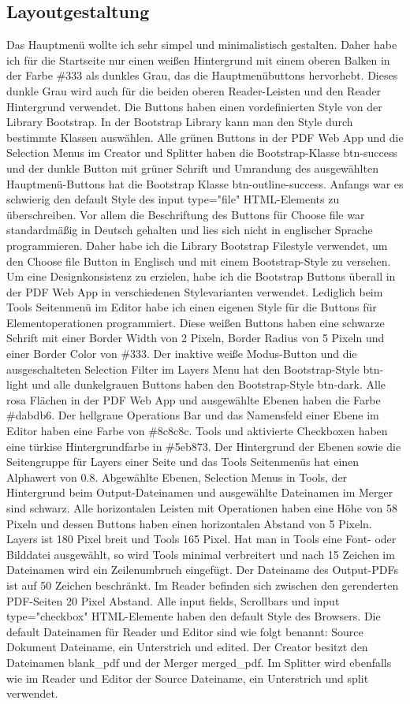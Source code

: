 \subsection{Layoutgestaltung}
Das Hauptmenü wollte ich sehr simpel und minimalistisch gestalten. Daher habe ich für die Startseite nur einen weißen Hintergrund mit einem oberen Balken in der Farbe \#333 als dunkles Grau, das die Hauptmenübuttons hervorhebt. Dieses dunkle Grau wird auch für die beiden oberen Reader-Leisten und den Reader Hintergrund verwendet. Die Buttons haben einen vordefinierten Style von der Library Bootstrap. In der Bootstrap Library kann man den Style durch bestimmte Klassen auswählen. Alle grünen Buttons in der PDF Web App und die Selection Menus im Creator und Splitter haben die Bootstrap-Klasse btn-success und der dunkle Button mit grüner Schrift und Umrandung des ausgewählten Hauptmenü-Buttons hat die Bootstrap Klasse btn-outline-success. Anfangs war es schwierig den default Style des input type="file" HTML-Elements zu überschreiben. Vor allem die Beschriftung des Buttons für Choose file war standardmäßig in Deutsch gehalten und lies sich nicht in englischer Sprache programmieren. Daher habe ich die Library Bootstrap Filestyle verwendet, um den Choose file Button in Englisch und mit einem Bootstrap-Style zu versehen. Um eine Designkonsistenz zu erzielen, habe ich die Bootstrap Buttons überall in der PDF Web App in verschiedenen Stylevarianten verwendet. Lediglich beim Tools Seitenmenü im Editor habe ich einen eigenen Style für die Buttons für Elementoperationen programmiert. Diese weißen Buttons haben eine schwarze Schrift mit einer Border Width von 2 Pixeln, Border Radius von 5 Pixeln und einer Border Color von \#333. Der inaktive weiße Modus-Button und die ausgeschalteten Selection Filter im Layers Menu hat den Bootstrap-Style btn-light und alle dunkelgrauen Buttons haben den Bootstrap-Style btn-dark. Alle rosa Flächen in der PDF Web App und ausgewählte Ebenen haben die Farbe \#dabdb6. Der hellgraue Operations Bar und das Namensfeld einer Ebene im Editor haben eine Farbe von \#8c8c8c. Tools und aktivierte Checkboxen haben eine türkise Hintergrundfarbe in \#5eb873. Der Hintergrund der Ebenen sowie die Seitengruppe für Layers einer Seite und das Tools Seitenmenüs hat einen Alphawert von 0.8. Abgewählte Ebenen, Selection Menus in Tools, der Hintergrund beim Output-Dateinamen und ausgewählte Dateinamen im Merger sind schwarz. Alle horizontalen Leisten mit Operationen haben eine Höhe von 58 Pixeln und dessen Buttons haben einen horizontalen Abstand von 5 Pixeln. Layers ist 180 Pixel breit und Tools 165 Pixel. Hat man in Tools eine Font- oder Bilddatei ausgewählt, so wird Tools minimal verbreitert und nach 15 Zeichen im Dateinamen wird ein Zeilenumbruch eingefügt. Der Dateiname des Output-PDFs ist auf 50 Zeichen beschränkt. Im Reader befinden sich zwischen den gerenderten PDF-Seiten 20 Pixel Abstand. Alle input fields, Scrollbars und input type="checkbox" HTML-Elemente haben den default Style des Browsers. Die default Dateinamen für Reader und Editor sind wie folgt benannt: Source Dokument Dateiname, ein Unterstrich und edited. Der Creator besitzt den Dateinamen blank\_pdf und der Merger merged\_pdf. Im Splitter wird ebenfalls wie im Reader und Editor der Source Dateiname, ein Unterstrich und split verwendet. 



